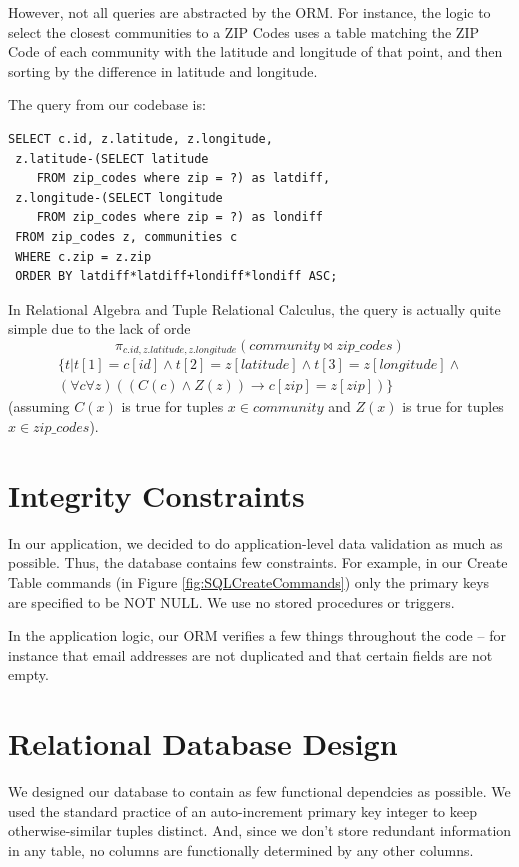 \documentclass{acm_proc_article-sp}
\begin{document}
However, not all queries are abstracted by the ORM. For instance, the logic to select the closest
communities to a ZIP Codes uses a table matching the ZIP Code of each community with the latitude and
longitude of that point, and then sorting by the difference in latitude and longitude.

The query from our codebase is:
\begin{lstlisting}
SELECT c.id, z.latitude, z.longitude, 
 z.latitude-(SELECT latitude 
    FROM zip_codes where zip = ?) as latdiff, 
 z.longitude-(SELECT longitude 
    FROM zip_codes where zip = ?) as londiff 
 FROM zip_codes z, communities c 
 WHERE c.zip = z.zip 
 ORDER BY latdiff*latdiff+londiff*londiff ASC;
\end{lstlisting}

In Relational Algebra and Tuple Relational Calculus, the query is actually quite simple due to the lack of orde
\[ \pi_{c.id,z.latitude,z.longitude}(\textit{community}\bowtie\textit{zip\_codes}) \]
\[ 
\begin{split}\{ t | t[1] = c[id] \land t[2] = z[latitude] \land t[3] = z[longitude] \land \\
(\forall c\forall z)((C(c) \land Z(z)) \to c[zip] = z[zip])
\}
\end{split}
\]
(assuming $C(x)$ is true for tuples $x \in \textit{community}$ and $Z(x)$ is true for tuples $x \in \textit{zip\_codes}$).

\section{Integrity Constraints}
In our application, we decided to do application-level data validation as much as possible. Thus, the database
contains few constraints. For example, in our Create Table commands (in Figure \ref{fig:SQLCreateCommands}) only
the primary keys are specified to be NOT NULL. We use no stored procedures or triggers.

In the application logic, our ORM verifies a few things throughout the code -- for instance that email addresses 
are not duplicated and that certain fields are not empty.

\section{Relational Database Design}
We designed our database to contain as few functional dependcies as possible. We used the standard practice of an
auto-increment primary key integer to keep otherwise-similar tuples distinct. And, since we don't store redundant information
in any table, no columns are functionally determined by any other columns.
\end{document}
